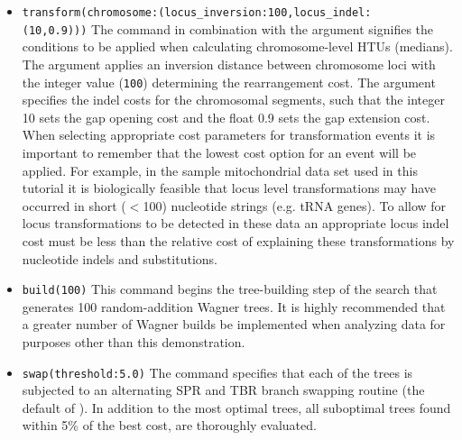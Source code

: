 \begin{itemize}
(\texttt{mauveout}), which when read into Mauve \cite{darlingetal2004},
can track the movement of LCBs between sequences.  Here, Mauve
alignment files will be generated with the names ``mauve\_i\_j.alignment''
where i and j are median states. Sequence ambiguities will not be
resolved to generate additional medians beyond those determined by
the data (). These files can be
used in conjunction with the  output to
determine inferred rearrangement events. In the analysis of unannotated
chromosomes, the data {\bf must} be transformed to
 when using the Mauve aligner.  
\item \texttt{transform(chromosome:(locus\_inversion:100,locus\_indel:\\(10,0.9)))}
The  command in combination with the argument
 signifies the conditions to be applied
when calculating chromosome-level HTUs (medians).  The argument
 applies an inversion distance between
chromosome loci with the integer value (\texttt{100}) determining
the rearrangement cost. The argument 
specifies the indel costs for the chromosomal segments, such that
the integer 10 sets the gap opening cost and the float 0.9 sets the gap extension
cost.  When selecting appropriate cost parameters for transformation
events it is important to remember that the lowest cost option for
an event will be applied. For example, in the sample mitochondrial
data set used in this tutorial it is biologically feasible that
locus level transformations may have occurred in short ($<$100)
nucleotide strings (e.g. tRNA genes). To allow for locus transformations
to be detected in these data an appropriate locus indel cost must
be less than the relative cost of explaining these transformations
by nucleotide indels and substitutions.  
\item \texttt{build(100)} This command begins the tree-building step 
of the search that generates 100 random-addition Wagner trees. 
It is highly recommended that a greater number of Wagner builds 
be implemented when analyzing data for purposes other than this demonstration.  
\item \texttt{swap(threshold:5.0)} The  command specifies
that each of the trees is subjected to an alternating SPR and TBR
branch swapping routine (the default of \poy). In addition to the
most optimal trees, all suboptimal trees found within 5\% of the
best cost, are thoroughly evaluated.  

\end{itemize}
